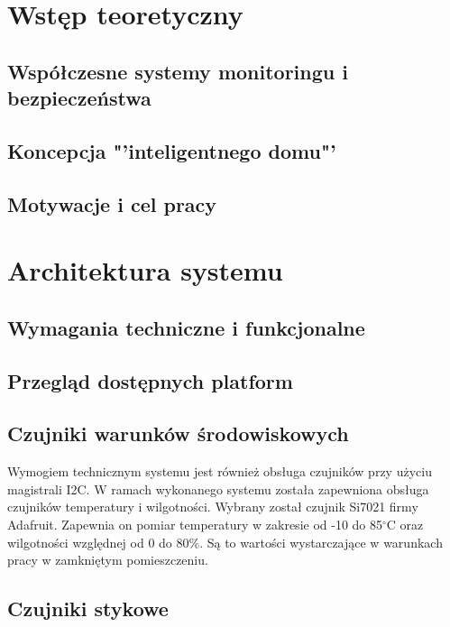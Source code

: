 \documentclass[a4paper,12pt,twoside]{article}
\begin{document}


\tableofcontents
\setcounter{tocdepth}{2}
\newpage

\section{Wstęp teoretyczny}

\subsection{Współczesne systemy monitoringu i bezpieczeństwa}

\subsection{Koncepcja "'inteligentnego domu"'}

\subsection{Motywacje i cel pracy}

\section{Architektura systemu}

\subsection{Wymagania techniczne i funkcjonalne}

\subsection{Przegląd dostępnych platform}

\subsection{Czujniki warunków środowiskowych}
Wymogiem technicznym systemu jest również obsługa czujników przy użyciu magistrali I2C. W ramach wykonanego systemu została zapewniona obsługa czujników temperatury i wilgotności. Wybrany został czujnik Si7021 firmy Adafruit. Zapewnia on pomiar temperatury w zakresie od -10 do 85$^\circ$C oraz wilgotności względnej od 0 do 80\%. Są to wartości wystarczające w warunkach pracy w zamkniętym pomieszczeniu.

\subsection{Czujniki stykowe}
\end{document}
